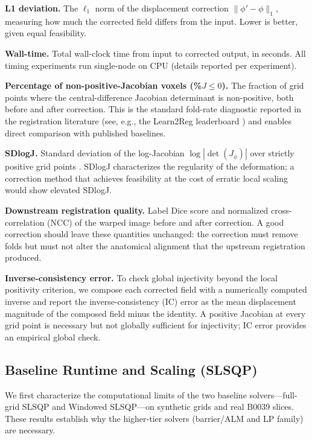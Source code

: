 \textbf{L1 deviation.} The $\ell_1$ norm of the displacement correction $\|\phi' - \phi\|_1$, measuring how much the corrected field differs from the input. Lower is better, given equal feasibility.

\textbf{Wall-time.} Total wall-clock time from input to corrected output, in seconds. All timing experiments run single-node on CPU (details reported per experiment).

\textbf{Percentage of non-positive-Jacobian voxels (\%$J{\leq}0$).} The fraction of grid points where the central-difference Jacobian determinant is non-positive, both before and after correction. This is the standard fold-rate diagnostic reported in the registration literature (see, e.g., the Learn2Reg leaderboard \cite{learn2reg2023}) and enables direct comparison with published baselines.

\textbf{SDlogJ.} Standard deviation of the log-Jacobian $\log|\det(J_\phi)|$ over strictly positive grid points \cite{learn2reg2023}. SDlogJ characterizes the regularity of the deformation; a correction method that achieves feasibility at the cost of erratic local scaling would show elevated SDlogJ.

\textbf{Downstream registration quality.} Label Dice score and normalized cross-correlation (NCC) of the warped image before and after correction. A good correction should leave these quantities unchanged: the correction must remove folds but must not alter the anatomical alignment that the upstream registration produced.

\textbf{Inverse-consistency error.} To check global injectivity beyond the local positivity criterion, we compose each corrected field with a numerically computed inverse and report the inverse-consistency (IC) error as the mean displacement magnitude of the composed field minus the identity. A positive Jacobian at every grid point is necessary but not globally sufficient for injectivity; IC error provides an empirical global check.

\subsection{Baseline Runtime and Scaling (SLSQP)}
\label{sec:baseline_runtime}

We first characterize the computational limits of the two baseline solvers—full-grid SLSQP and Windowed SLSQP—on synthetic grids and real B0039 slices. These results establish why the higher-tier solvers (barrier/ALM and LP family) are necessary.

